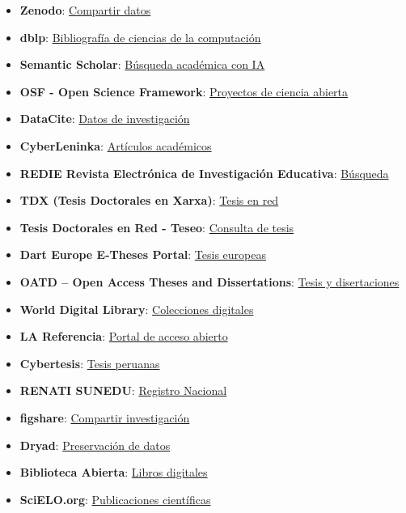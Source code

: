 \documentclass[
  jou,
  floatsintext,
  longtable,
  a4paper,
  nolmodern,
  notxfonts,
  notimes,
  colorlinks=true,linkcolor=blue,citecolor=blue,urlcolor=blue]{apa7}
\begin{document}
\begin{itemize}
\item
  \textbf{Zenodo}: \href{https://zenodo.org/}{Compartir datos}
\item
  \textbf{dblp}: \href{https://dblp.uni-trier.de/}{Bibliografía de
  ciencias de la computación}
\item
  \textbf{Semantic Scholar}:
  \href{https://www.semanticscholar.org/}{Búsqueda académica con IA}
\item
  \textbf{OSF - Open Science Framework}:
  \href{https://osf.io/}{Proyectos de ciencia abierta}
\item
  \textbf{DataCite}: \href{https://datacite.org/}{Datos de
  investigación}
\item
  \textbf{CyberLeninka}: \href{https://cyberleninka.org/}{Artículos
  académicos}
\item
  \textbf{REDIE \textbar{} Revista Electrónica de Investigación
  Educativa}: \href{https://redie.uabc.mx/redie/search}{Búsqueda}
\item
  \textbf{TDX (Tesis Doctorales en Xarxa)}:
  \href{https://www.tesisenred.net/}{Tesis en red}
\item
  \textbf{Tesis Doctorales en Red - Teseo}:
  \href{https://www.educacion.gob.es/teseo/irGestionarConsulta.do}{Consulta
  de tesis}
\item
  \textbf{Dart Europe E-Theses Portal}:
  \href{https://www.dart-europe.eu/}{Tesis europeas}
\item
  \textbf{OATD -- Open Access Theses and Dissertations}:
  \href{https://oatd.org/}{Tesis y disertaciones}
\item
  \textbf{World Digital Library}:
  \href{https://www.loc.gov/collections/world-digital-library/about-this-collection/}{Colecciones
  digitales}
\item
  \textbf{LA Referencia}:
  \href{https://www.lareferencia.info/es/}{Portal de acceso abierto}
\item
  \textbf{Cybertesis}: \href{https://cybertesis.unmsm.edu.pe/}{Tesis
  peruanas}
\item
  \textbf{RENATI SUNEDU}: \href{https://renati.sunedu.gob.pe/}{Registro
  Nacional}
\item
  \textbf{figshare}: \href{https://figshare.com/}{Compartir
  investigación}
\item
  \textbf{Dryad}: \href{https://datadryad.org/stash}{Preservación de
  datos}
\item
  \textbf{Biblioteca Abierta}:
  \href{https://openlibrary.org/?lang=es}{Libros digitales}
\item
  \textbf{SciELO.org}: \href{https://www.scielo.org/}{Publicaciones
  científicas}
\end{itemize}
\end{document}
